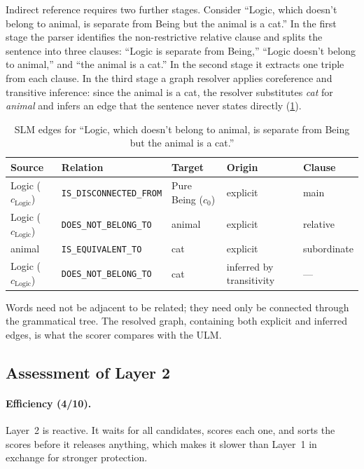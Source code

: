 \documentclass[twocolumn]{ulpaper}
\newcommand{\rel}[1]{\texttt{\small #1}}
\begin{document}
Indirect reference requires two further stages. Consider ``Logic, which doesn't belong to animal, is separate from Being but the animal is a cat.'' In the first stage the parser identifies the non-restrictive relative clause and splits the sentence into three clauses: ``Logic is separate from Being,'' ``Logic doesn't belong to animal,'' and ``the animal is a cat.'' In the second stage it extracts one triple from each clause. In the third stage a graph resolver applies coreference and transitive inference: since the animal is a cat, the resolver substitutes \emph{cat} for \emph{animal} and infers an edge that the sentence never states directly (\cref{tab:inferred}).

\begin{table}[t]
\centering
\caption{SLM edges for ``Logic, which doesn't belong to animal, is separate from Being but the animal is a cat.''}
\label{tab:inferred}
\small
\begin{tabular}{@{}lllll@{}}
\toprule
\textbf{Source} & \textbf{Relation} & \textbf{Target} & \textbf{Origin} & \textbf{Clause} \\
\midrule
Logic ($c_{\text{Logic}}$) & \rel{IS\_DISCONNECTED\_FROM} & Pure Being ($c_0$) & explicit & main \\
Logic ($c_{\text{Logic}}$) & \rel{DOES\_NOT\_BELONG\_TO} & animal & explicit & relative \\
animal & \rel{IS\_EQUIVALENT\_TO} & cat & explicit & subordinate \\
Logic ($c_{\text{Logic}}$) & \rel{DOES\_NOT\_BELONG\_TO} & cat & inferred by transitivity & --- \\
\bottomrule
\end{tabular}
\end{table}

Words need not be adjacent to be related; they need only be connected through the grammatical tree. The resolved graph, containing both explicit and inferred edges, is what the scorer compares with the ULM.

\subsection{Assessment of Layer 2}

\paragraph{Efficiency (4/10).} Layer~2 is reactive. It waits for all candidates, scores each one, and sorts the scores before it releases anything, which makes it slower than Layer~1 in exchange for stronger protection.
\end{document}
